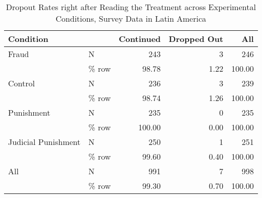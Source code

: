 \begin{table}

\caption{Dropout Rates right after Reading the Treatment across Experimental Conditions,
Survey Data in Latin America}
\centering
\begin{tabular}[t]{llrrr}
\toprule
Condition &   & Continued & Dropped Out & All\\
\midrule
Fraud & N & 243 & 3 & 246\\
 & \% row & \num{98.78} & \num{1.22} & \num{100.00}\\
Control & N & 236 & 3 & 239\\
 & \% row & \num{98.74} & \num{1.26} & \num{100.00}\\
Punishment & N & 235 & 0 & 235\\
 & \% row & \num{100.00} & \num{0.00} & \num{100.00}\\
Judicial Punishment & N & 250 & 1 & 251\\
 & \% row & \num{99.60} & \num{0.40} & \num{100.00}\\
All & N & 991 & 7 & 998\\
 & \% row & \num{99.30} & \num{0.70} & \num{100.00}\\
\bottomrule
\end{tabular}
\end{table}
